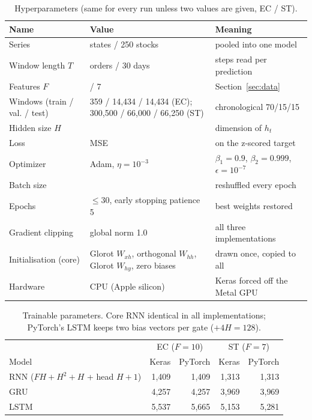 \documentclass[11pt, a4paper]{article}
\begin{document}
\begin{table}[H]
\centering
\caption{Hyperparameters (same for every run unless two values are given, EC / ST).}
\label{tab:hyper}
\small
\begin{tabularx}{\textwidth}{>{\raggedright\arraybackslash}p{3.8cm}>{\raggedright\arraybackslash}p{4.5cm}X}
\toprule
Name & Value & Meaning \\
\midrule
Series & 27 states / 250 stocks & pooled into one model \\
Window length $T$ & 10 orders / 30 days & steps read per prediction \\
Features $F$ & 10 / 7 & Section~\ref{sec:data} \\
Windows (train / val. / test) & 67{,}359 / 14{,}434 / 14{,}434 (EC); 300{,}500 / 66{,}000 / 66{,}250 (ST) & chronological 70/15/15 \\
Hidden size $H$ & 32 & dimension of $h_t$ \\
Loss & MSE & on the z-scored target \\
Optimizer & Adam, $\eta=10^{-3}$ & $\beta_1=0.9$, $\beta_2=0.999$, $\epsilon=10^{-7}$ \\
Batch size & 128 & reshuffled every epoch \\
Epochs & $\le30$, early stopping patience 5 & best weights restored \\
Gradient clipping & global norm 1.0 & all three implementations \\
Initialisation (core) & Glorot $W_{xh}$, orthogonal $W_{hh}$, Glorot $W_{hy}$, zero biases & drawn once, copied to all \\
Hardware & CPU (Apple silicon) & Keras forced off the Metal GPU \\
\bottomrule
\end{tabularx}
\end{table}

\begin{table}[H]
\centering
\caption{Trainable parameters. Core RNN identical in all implementations; PyTorch's LSTM keeps two bias vectors per gate ($+4H=128$).}
\label{tab:params}
\small
\begin{tabular}{lrrrr}
\toprule
 & \multicolumn{2}{c}{EC ($F=10$)} & \multicolumn{2}{c}{ST ($F=7$)} \\
Model & Keras & PyTorch & Keras & PyTorch \\
\midrule
RNN ($FH+H^2+H$ + head $H+1$) & 1{,}409 & 1{,}409 & 1{,}313 & 1{,}313 \\
GRU & 4{,}257 & 4{,}257 & 3{,}969 & 3{,}969 \\
LSTM & 5{,}537 & 5{,}665 & 5{,}153 & 5{,}281 \\
\bottomrule
\end{tabular}
\end{table}
\end{document}
